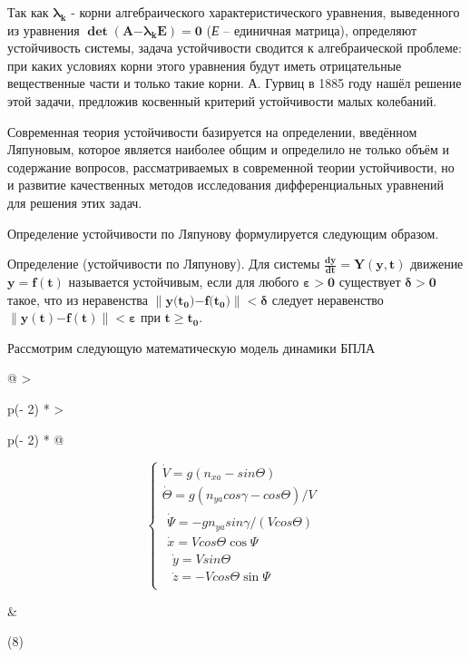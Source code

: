 Так как \(\mathbf{\lambda}_{\mathbf{k}}\) - корни алгебраического
характеристического уравнения, выведенного из уравнения
\(\mathbf{\det}\left( \mathbf{A}\mathbf{-}\mathbf{\lambda}_{\mathbf{k}}\mathbf{E} \right)\mathbf{= 0}\)
(\emph{Е} -- единичная матрица), определяют устойчивость системы, задача
устойчивости сводится к алгебраической проблеме: при каких условиях
корни этого уравнения будут иметь отрицательные вещественные части и
только такие корни. А. Гурвиц в 1885 году нашёл решение этой задачи,
предложив косвенный критерий устойчивости малых колебаний.

Современная теория устойчивости базируется на определении, введённом
Ляпуновым, которое является наиболее общим и определило не только объём
и содержание вопросов, рассматриваемых в современной теории
устойчивости, но и развитие качественных методов исследования
дифференциальных уравнений для решения этих задач.

Определение устойчивости по Ляпунову формулируется следующим образом.

Определение (устойчивости по Ляпунову). Для системы
\(\frac{\mathbf{dy}}{\mathbf{dt}}\mathbf{= Y}\left( \mathbf{y,t} \right)\)
движение \(\mathbf{y = f(t)}\) называется устойчивым, если для любого
\(\mathbf{\varepsilon > 0}\) существует \(\mathbf{\delta > 0}\) такое,
что из неравенства
\(\left\| \mathbf{y(}\mathbf{t}_{\mathbf{0}}\mathbf{)}\mathbf{-}\mathbf{f(}\mathbf{t}_{\mathbf{0}}\mathbf{)} \right\|\mathbf{< \delta}\)
следует неравенство
\(\left\| \mathbf{y(t)}\mathbf{-}\mathbf{f(t)} \right\|\mathbf{< \varepsilon}\)
при \(\mathbf{t}\mathbf{\geq}\mathbf{t}_{\mathbf{0}}\).

Рассмотрим следующую математическую модель динамики БПЛА

\begin{longtable}[]{@{}
  >{\raggedright\arraybackslash}p{(\columnwidth - 2\tabcolsep) * }
  >{\raggedright\arraybackslash}p{(\columnwidth - 2\tabcolsep) * }@{}}
\toprule\noalign{}
\begin{minipage}[b]{\linewidth}\raggedright
\[\left\{ \begin{matrix}
\dot{V} = g(n_{xa} - sin\Theta) \\
\dot{\Theta} = g(n_{ya}cos\gamma - cos\Theta)/V \\
\begin{matrix}
\dot{\Psi} = - gn_{ya}sin\gamma/(Vcos\Theta) \\
\dot{x} = Vcos\Theta\cos\Psi \\
\begin{matrix}
\dot{y} = Vsin\Theta \\
\dot{z} = - Vcos\Theta\sin\Psi
\end{matrix}
\end{matrix}
\end{matrix} \right.\ \]
\end{minipage} & \begin{minipage}[b]{\linewidth}\raggedright
(8)
\end{minipage} \\
\midrule\noalign{}
\endhead
\bottomrule\noalign{}
\endlastfoot
\end{longtable}


